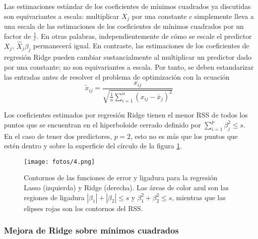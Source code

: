 Las estimaciones estándar de los coeficientes de mínimos cuadrados ya discutidas son equivariantes a escala: multiplicar $X_j$ por una constante $c$ simplemente lleva a una escala de las estimaciones de los coeficientes de mínimos cuadrados por un factor de $\frac{1}{c}$. En otras palabras, independientemente de cómo se escale el predictor $X_j$, $\hat{X}_j \beta_j$ permanecerá igual. En contraste, las estimaciones de los coeficientes de regresión Ridge pueden cambiar sustancialmente al multiplicar un predictor dado por una constante; no son equivariantes a escala. Por tanto, se deben estandarizar las entradas antes de resolver el problema de optimización con la ecuación 
\begin{equation}
\tilde{x}_{ij} = \frac{x_{ij}}{\sqrt{\frac{1}{n} \sum_{i=1}^n (x_{ij} - \bar{x}_j)^2}}
\end{equation}

Los coeficientes estimados por regresión Ridge tienen el menor RSS de todos los puntos que se encuentran en el hiperboloide cerrado definido por $\sum_{i=1}^p \beta_j^2 \leq s$. En el caso de tener dos predictores, $p=2$, esto no es más que los puntos que estén dentro y sobre la superficie del círculo de la figura \ref{fig:reg}.  

\begin{figure}[h]
\centering
\texttt{[image: fotos/4.png]}
\caption{Contornos de las funciones de error y ligadura para la regresión Lasso (izquierda) y Ridge (derecha). Las áreas de color azul son las regiones de ligadura $|\beta_1| + |\beta_2| \leq s$ y $\beta_1^2 + \beta_2^2 \leq s$, mientras que las elipses rojas son los contornos del RSS.}
\label{fig:reg}
\end{figure}

\subsubsection{Mejora de Ridge sobre mínimos cuadrados}

